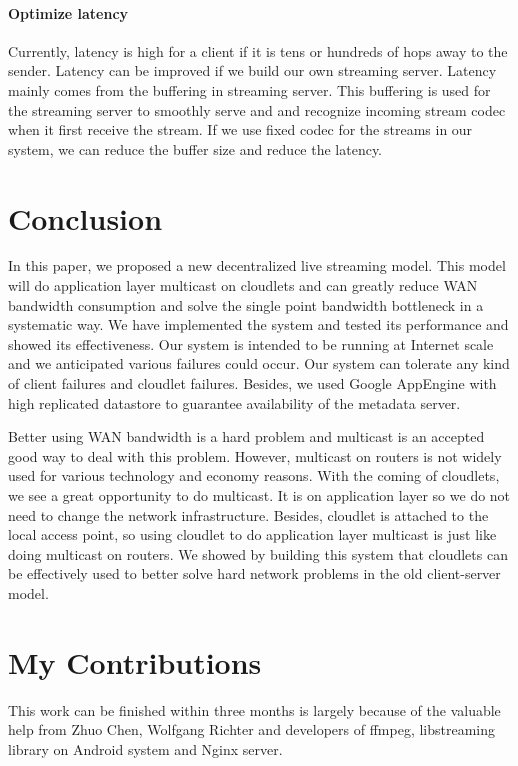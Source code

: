 \documentclass[letterpaper,twocolumn,10pt]{article}
\begin{document}
\paragraph{Optimize latency}
Currently, latency is high for a client if it is tens or hundreds of hops away to the sender. Latency can be improved if we build our own streaming server. Latency mainly comes from the buffering in streaming server. This buffering is used for the streaming server to smoothly serve and and recognize incoming stream codec when it first receive the stream. If we use fixed codec for the streams in our system, we can reduce the buffer size and reduce the latency.

\section{Conclusion}
In this paper, we proposed a new decentralized live streaming model. This model will do application layer multicast on cloudlets and can greatly reduce WAN bandwidth consumption and solve the single point bandwidth bottleneck in a systematic way. We have implemented the system and tested its performance and showed its effectiveness. Our system is intended to be running at Internet scale and we anticipated various failures could occur. Our system can tolerate any kind of client failures and cloudlet failures. Besides, we used Google AppEngine with high replicated datastore to guarantee availability of the metadata server.

Better using WAN bandwidth is a hard problem and multicast is an accepted good way to deal with this problem. However, multicast on routers is not widely used for various technology and economy reasons. With the coming of cloudlets, we see a great opportunity to do multicast. It is on application layer so we do not need to change the network infrastructure. Besides, cloudlet is attached to the local access point, so using cloudlet to do application layer multicast is just like doing multicast on routers. We showed by building this system that cloudlets can be effectively used to better solve hard network problems in the old client-server model.

\section{My Contributions}
This work can be finished within three months is largely because of the valuable help from Zhuo Chen, Wolfgang Richter and developers of ffmpeg, libstreaming library on Android system and Nginx server.
\end{document}
